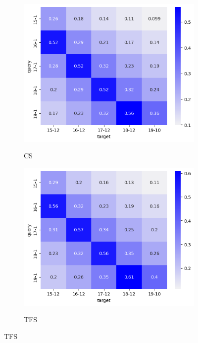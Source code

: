 \begin{figure}
    \centering
    \begin{subfigure}{0.48\linewidth}
    \includegraphics[width=\linewidth,alt={Heatmap for OS.}]{stylometryExtensions/figures/heat/os.png}
    \caption{CS}
    \label{fig:tempral_vary:os}
    \end{subfigure}
    \begin{subfigure}{0.48\linewidth}
    \includegraphics[width=\linewidth,alt={Heatmap for TFS.}]{stylometryExtensions/figures/heat/tfs.png}
    \caption{TFS}
    \label{fig:tempral_vary:tfs}
    \end{subfigure}
    

\end{figure}
